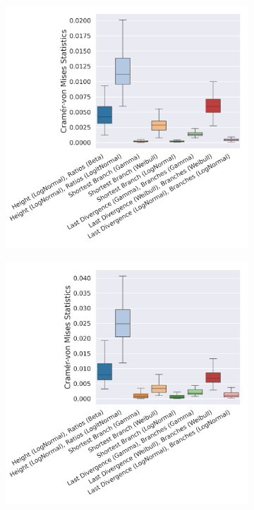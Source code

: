 \documentclass[10pt,letterpaper]{article}
\begin{document}
\begin{figure}
	\caption{The Cramér-von Mises criterion for the different distributions and datasets. (The lower the better.)}
	
	\centering
	\begin{subfigure}[b]{0.4\textwidth}
		\centering
		\includegraphics[width=\textwidth]{figures/yule-100-ccd1-cvm.png}
	\end{subfigure}
	\begin{subfigure}[b]{0.4\textwidth}
		\centering
		\includegraphics[width=\textwidth]{figures/yule-200-ccd1-cvm.png}
	\end{subfigure}
	

\end{figure}
\end{document}
